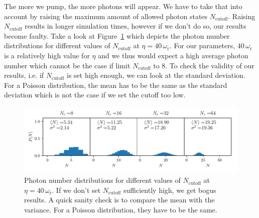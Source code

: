 \noindent The more we pump, the more photons will appear. We have to take that into account by raising the maximum amount of allowed photon states $N_\text{cutoff}$. Raising $N_\text{cutoff}$ results in longer simulation times, however if we don't do so, our results become faulty. Take a look at Figure~\ref{model_limit} which depicts the photon number distributions for different values of $N_\text{cutoff}$ at $\eta = 40 \, \omega_\text{r}$. For our parameters, $40 \, \omega_\text{r}$ is a relatively high value for $\eta$ and we thus would expect a high average photon number which cannot be the case if limit $N_\text{cutoff}$ to 8. To check the validity of our results, i.e. if $N_\text{cutoff}$ is set high enough, we can look at the standard deviation. For a Poisson distribution, the mean has to be the same as the standard deviation which is not the case if we set the cutoff too low.

\begin{figure}[!htb]
	\centering
	\includegraphics[width=1\textwidth]{images/model_limit_long.pdf}
	\caption{Photon number distributions for different values of $N_\text{cutoff}$ at $\eta = 40 \, \omega_\text{r}$. If we don't set $N_\text{cutoff}$ sufficiently high, we get bogus results. A quick sanity check is to compare the mean with the variance. For a Poisson distribution, they have to be the same.}
	\label{model_limit}
\end{figure}
\FloatBarrier

